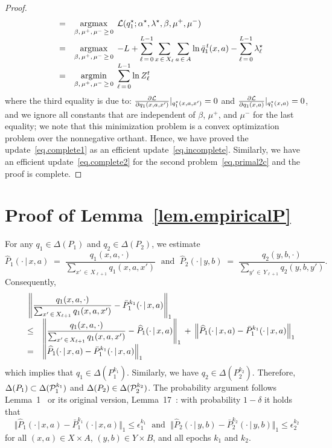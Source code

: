 \documentclass[12pt, final]{l4dc2023}
\begin{document}
\begin{proof}
\[\begin{array}{rcl}
	&=&\displaystyle
	\operatorname*{argmax}_{\beta,\, \mu^+,\,\mu^-\,\geq \,0}\; {\mathcal{L}}(q_1^\star; \alpha^\star, \lambda^\star,\beta,\mu^+,\mu^-)
	\\[0.2cm]
	&=&\displaystyle
	\operatorname*{argmax}_{\beta,\, \mu^+,\,\mu^-\,\geq \,0}\; -L+\sum_{\ell\,=\,0}^{L-1}\sum_{x\,\in\,X_\ell}\sum_{a\,\in\, A} \ln \bar q_1^{\,t}(x,a) -\sum_{\ell\,=\,0}^{L-1} \lambda_\ell^\star
	\\[0.2cm]
	&=&\displaystyle
	\operatorname*{argmin}_{\beta,\, \mu^+,\,\mu^-\,\geq \,0}\; \sum_{\ell\,=\,0}^{L-1} \ln Z_\ell^t
	\end{array}
	\]
	where the third equality is due to: $ \frac{\partial {\mathcal{L}}}{\partial q_1(x,a,x') } \vert_{q_1^\star(x,a,x')}=0 $ and $\frac{\partial {\mathcal{L}}}{\partial q_1(x,a) } \vert_{q_1^\star(x,a)}= 0$, and we ignore all constants that are independent of $\beta$, $\mu^+$, and $\mu^-$ for the last equality; we note that this minimization problem is a convex optimization problem over the nonnegative orthant. Hence, we have proved the update~\eqref{eq.complete1} as an efficient update~\eqref{eq.incomplete}.
	Similarly, we have an efficient update~\eqref{eq.complete2} for the second problem~\eqref{eq.primal2c} and the proof is complete.
	
\end{proof}

\section{Proof of Lemma~\ref{lem.empiricalP}}
\label{ap.empiricalP}

For any $q_1\in \Delta(P_1)$ and $q_2\in \Delta(P_2)$, we estimate
\[
\hat P_1(\cdot\,\vert\,x,a)\;=\;\frac{q_1(x,a, \cdot)}{\sum_{x'\,\in\,X_{\ell+1}}q_1(x,a, x')}
\;\text{ and }\;
\hat P_2(\cdot\,\vert\,y,b)\;=\;\frac{q_2(y,b, \cdot)}{\sum_{y'\,\in\,Y_{\ell+1}}q_2(y,b, y')}.
\]
Consequently,
\[
\begin{array}{rcl}
&& \!\!\!\! \!\!\!\! \!\! 
\displaystyle
\norm{ \frac{q_1(x,a, \cdot)}{\sum_{x'\,\in\,X_{\ell+1}}q_1(x,a, x')} - \bar P_1^{k_1}(\cdot\,\vert\,x,a) }_1 
\\[0.2cm]
&\leq &
\displaystyle
\norm{ \frac{q_1(x,a, \cdot)}{\sum_{x'\,\in\,X_{\ell+1}}q_1(x,a, x')} -\hat P_1(\cdot\,\vert\,x,a) }_1
\,+\,
\norm{ \hat P_1(\cdot\,\vert\,x,a)-\bar P_1^{k_1}(\cdot\,\vert\,x,a) }_1
\\[0.2cm]
&=&\displaystyle 
\norm{ \hat P_1(\cdot\,\vert\,x,a)-\bar P_1^{k_1}(\cdot\,\vert\,x,a) }_1
\end{array}
\]
which implies that $q_1\in \Delta(P_1^{k_1})$. Similarly, we have $q_2\in \Delta(P_2^{k_2})$. Therefore, $\Delta(P_1)\subset \Delta({\mathcal{P}}_1^{k_1})$ and $\Delta(P_2)\in\Delta({\mathcal{P}}_2^{k_2})$. The probability argument follows Lemma~1~\citep{neu2012adversarial} or its original version, Lemma~17~\citep{jaksch2010near}: with probability $1-\delta$ it holds that
\[
\Vert \hat P_1(\cdot\,\vert\,x,a) - \bar P_1^{k_1}(\cdot\,\vert\,x,a) \Vert_1 \leq \epsilon_1^{k_1}
\;\text{ and }\;
\Vert \hat P_2(\cdot\,\vert\,y,b) - \bar P_2^{k_2}(\cdot\,\vert\,y,b) \Vert_1 \leq \epsilon_2^{k_2}
\]
for all $(x,a)\in X\times A$, $(y,b)\in Y\times B$, and all epochs $k_1$ and $k_2$. 
\end{document}
